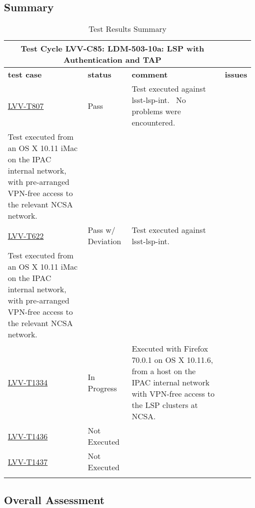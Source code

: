 \documentclass[DM,lsstdraft,STR,toc]{lsstdoc}
\begin{document}
\subsection{Summary}
\label{sect:summarytable}

\begin{longtable}{p{}p{}p{}p{}}
\toprule

  \multicolumn{3}{c}{ Test Cycle {\bf LVV-C85: LDM-503-10a: LSP with Authentication and TAP
 }} \\\hline

  {\bf \footnotesize test case} & {\bf \footnotesize status} & {\bf \footnotesize comment} & {\bf \footnotesize issues} \\\toprule

    \href{https://jira.lsstcorp.org/secure/Tests.jspa#/testCase/LVV-T807}{LVV-T807}
    & Pass & Test executed against lsst-lsp-int. ~No problems were encountered.\\
Test executed from an OS X 10.11 iMac on the IPAC internal network, with
pre-arranged VPN-free access to the relevant NCSA network.
 &
    \\\hline
    \href{https://jira.lsstcorp.org/secure/Tests.jspa#/testCase/LVV-T622}{LVV-T622}
    & Pass w/ Deviation & Test executed against lsst-lsp-int. ~\\
Test executed from an OS X 10.11 iMac on the IPAC internal network, with
pre-arranged VPN-free access to the relevant NCSA network.
 &
    \\\hline
    \href{https://jira.lsstcorp.org/secure/Tests.jspa#/testCase/LVV-T1334}{LVV-T1334}
    & In Progress & Executed with Firefox 70.0.1 on OS X 10.11.6, from a host on the IPAC
internal network with VPN-free access to the LSP clusters at NCSA.
 &
    \\\hline
    \href{https://jira.lsstcorp.org/secure/Tests.jspa#/testCase/LVV-T1436}{LVV-T1436}
    & Not Executed &  &
    \\\hline
    \href{https://jira.lsstcorp.org/secure/Tests.jspa#/testCase/LVV-T1437}{LVV-T1437}
    & Not Executed &  &
    \\\hline

\caption{Test Results Summary}
\label{table:summary}
\end{longtable}

\subsection{Overall Assessment}
\label{sect:overallassessment}
\end{document}
